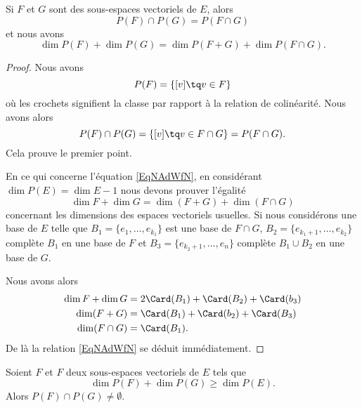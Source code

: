 \begin{proposition}     \label{PropuqpWVx}
    Si \( F\) et \( G\) sont des sous-espaces vectoriels de \( E\), alors
    \begin{equation}
        P(F)\cap P(G)=P(F\cap G)
    \end{equation}
    et nous avons
    \begin{equation}        \label{EqNAdWfN}
        \dim P(F)+\dim P(G)=\dim P(F+G)+\dim P(F\cap G).
    \end{equation}
\end{proposition}

\begin{proof}
    Nous avons 
    \begin{equation}
        P(F)=\{ [v]\tq v\in F \}
    \end{equation}
    où les crochets signifient la classe par rapport à la relation de colinéarité. Nous avons alors
    \begin{equation}
        P(F)\cap P(G)=\{ [v]\tq v\in F\cap G \}=P(F\cap G).
    \end{equation}
    Cela prouve le premier point.

    En ce qui concerne l'équation \eqref{EqNAdWfN}, en considérant \( \dim P(E)=\dim E-1\) nous devons prouver l'égalité
    \begin{equation}
        \dim F+\dim G=\dim (F+G)+\dim(F\cap G)
    \end{equation}
    concernant les dimensions des espaces vectoriels usuelles. Si nous considérons une base de \( E\) telle que \( B_1=\{ e_1,\ldots, e_{k_1} \}\) est une base de \( F\cap G\), \( B_2=\{ e_{k_1+1},\ldots, e_{k_2} \}\) complète \( B_1\) en une base de \( F\) et \( B_3=\{ e_{k_2+1},\ldots, e_n \}\) complète \( B_1\cup B_2\) en une base de \( G\).

    Nous avons alors
    \begin{subequations}
        \begin{align}
            \dim F+\dim G&=2\Card(B_1)+\Card(B_2)+\Card(b_3)\\
            \dim(F+G)&=\Card(B_1)+\Card(b_2)+\Card(B_3)\\
            \dim(F\cap G)&=\Card(B_1).
        \end{align}
    \end{subequations}
    De là la relation \eqref{EqNAdWfN} se déduit immédiatement.    
\end{proof}

\begin{theorem}[incidence]
    Soient \( F\) et \( F\) deux sous-espaces vectoriels de \( E\) tels que 
    \begin{equation}
        \dim P(F)+\dim P(G)\geq \dim P(E).
    \end{equation}
    Alors \( P(F)\cap P(G)\neq \emptyset\).
\end{theorem}

